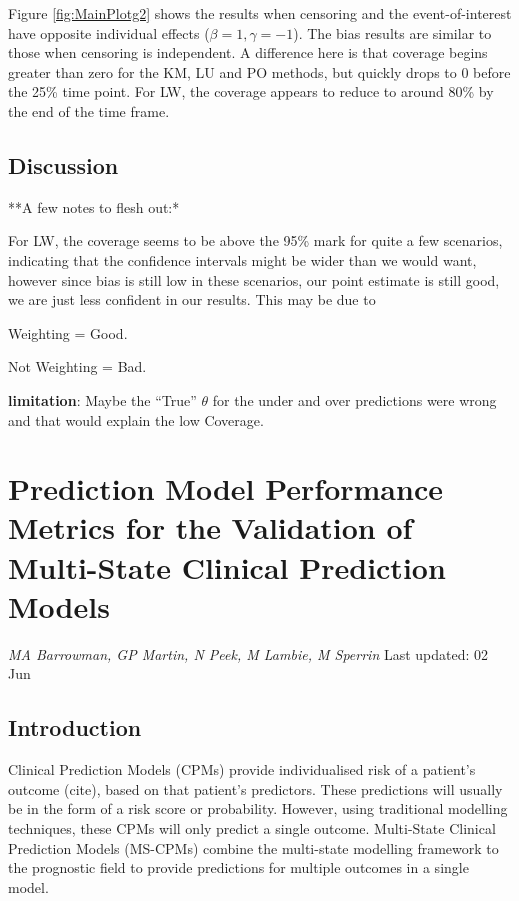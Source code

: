 \documentclass[12pt,PhD,twoside,openright]{muthesis}
\begin{document}
Figure \ref{fig:MainPlotg2} shows the results when censoring and the event-of-interest have opposite individual effects (\(\beta=1, \gamma=-1\)). The bias results are similar to those when censoring is independent. A difference here is that coverage begins greater than zero for the KM, LU and PO methods, but quickly drops to 0 before the 25\% time point. For LW, the coverage appears to reduce to around 80\% by the end of the time frame.

\hypertarget{discussion-2}{%
\section{Discussion}\label{discussion-2}}

**A few notes to flesh out:*

For LW, the coverage seems to be above the 95\% mark for quite a few scenarios, indicating that the confidence intervals might be wider than we would want, however since bias is still low in these scenarios, our point estimate is still good, we are just less confident in our results. This may be due to

Weighting = Good.

Not Weighting = Bad.

\textbf{limitation}: Maybe the ``True'' \(\theta\) for the under and over predictions were wrong and that would explain the low Coverage.

\hypertarget{chap-performance-metrics}{%
\chapter{Prediction Model Performance Metrics for the Validation of Multi-State Clinical Prediction Models}\label{chap-performance-metrics}}

\emph{MA Barrowman, GP Martin, N Peek, M Lambie, M Sperrin}
Last updated: 02 Jun

\hypertarget{introduction-5}{%
\section{Introduction}\label{introduction-5}}

Clinical Prediction Models (CPMs) provide individualised risk of a patient's outcome (cite), based on that patient's predictors. These predictions will usually be in the form of a risk score or probability. However, using traditional modelling techniques, these CPMs will only predict a single outcome. Multi-State Clinical Prediction Models (MS-CPMs) combine the multi-state modelling framework to the prognostic field to provide predictions for multiple outcomes in a single model.
\end{document}
